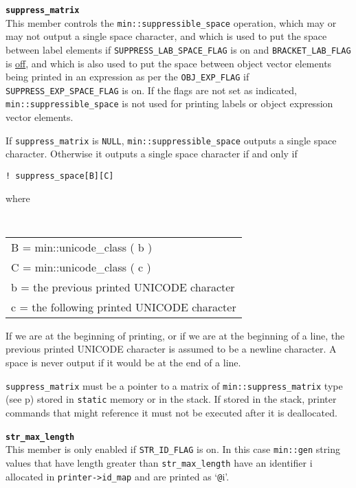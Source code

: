 \documentclass[12pt]{article}
\makeatletter
\newcommand{\TT}[1]{{\tt \bfseries #1}}
\newcommand{\ttmkey}[2]{\TT{#1}\index{#1@{\tt #1}!#2}}
\newcommand{\pagref}[1]{p\pageref{#1}}
\newcommand{\EOL}{\penalty \exhyphenpenalty}
\newenvironment{itemlist}[1][1.2in]%
	{\begin{list}{}{\setlength{\labelwidth}{#1}%
		        \setlength{\leftmargin}{\labelwidth}%
		        \addtolength{\leftmargin}{+0.2in}%
		        \renewcommand{\makelabel}[1]{##1\hfill}}}%
	{\end{list}}
\makeatother
\begin{document}
\begin{itemlist}[0.4in]
\item[\ttmkey{suppress\_matrix}{in {\tt min::gen\_format}}]~\\
This member controls the {\tt min::suppressible\_space} operation, which
may or may not output a single space character, and which is used
to put the space between label elements
if {\tt SUP\-PRESS\_\EOL LAB\_\EOL SPACE\_\EOL FLAG} is on
and {\tt BRACKET\_\EOL LAB\_\EOL FLAG} is \underline{off},
and which is also used to put the space between object vector elements
being printed in an expression as per the {\tt OBJ\_\EOL EXP\_\EOL FLAG}
if {\tt SUPPRESS\_\EOL EXP\_\EOL SPACE\_\EOL FLAG} is on.
If the flags are not set as indicated,
{\tt min::\EOL suppressible\_\EOL space} is not used for printing labels or
object expression vector elements.

If {\tt suppress\_\EOL matrix} is {\tt NULL},
{\tt min::\EOL suppressible\_\EOL space} outputs a single space character.
Otherwise it outputs a single space character if and only if
\begin{center}
\tt ! suppress\_space[B][C]
\end{center}
where
\begin{center}
\tt
\begin{tabular}{l}
B = min::unicode\_class ( b ) \\
C = min::unicode\_class ( c ) \\
b = {\rm the previous printed UNICODE character} \\
c = {\rm the following printed UNICODE character} \\
\end{tabular}
\end{center}

If we are at the beginning of printing, or if we are at the beginning
of a line, the previous printed UNICODE character
is assumed to be a newline character.  A space is
never output if it would be at the end of a line.

{\tt suppress\_matrix} must be a pointer to a matrix of
{\tt min::\EOL suppress\_\EOL matrix} type (see \pagref{MIN::SUPPRESS_MATRIX})
stored in {\tt static} memory or in the stack.  If stored in the stack,
printer commands that might reference it must not be executed after
it is deallocated.

\item[\ttmkey{str\_max\_length}{in {\tt min::gen\_format}}]~\\
This member is only enabled if {\tt STR\_\EOL ID\_\EOL FLAG} is on.
In this case {\tt min::gen} string values that have length greater
than {\tt str\_\EOL max\_\EOL length} have an identifier i allocated
in {\tt printer->\EOL id\_\EOL map} and are printed as `{\tt @}i'.


\end{itemlist}
\end{document}

